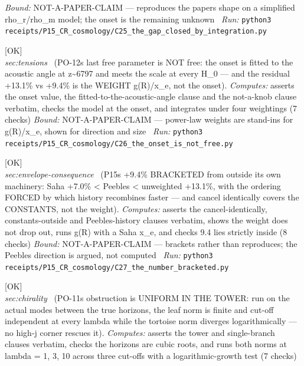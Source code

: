 \begin{description}
 \emph{Bound:} NOT-A-PAPER-CLAIM --- reproduces the papers shape on a simplified rho\_r/rho\_m model; the onset is the remaining unknown
\ \emph{Run:} \texttt{python3 receipts/P15\_CR\_cosmology/C25\_the\_gap\_closed\_by\_integration.py}
\item[\label{rcpt:C26_the_onset_is_not_free}\texttt{C26\_the\_onset\_is\_not\_free}]\hfill\textsf{[OK]}\\
\textit{sec:tensions} \ (PO-12s last free parameter is NOT free: the onset is fitted to the acoustic angle at z\textasciitilde{}6797 and meets the scale at every H\_0 --- and the residual +13.1\% vs +9.4\% is the WEIGHT g(R)/x\_e, not the onset). 
\emph{Computes:} asserts the onset value, the fitted-to-the-acoustic-angle clause and the not-a-knob clause verbatim, checks the model at the onset, and integrates under four weightings (7 checks)
 \emph{Bound:} NOT-A-PAPER-CLAIM --- power-law weights are stand-ins for g(R)/x\_e, shown for direction and size
\ \emph{Run:} \texttt{python3 receipts/P15\_CR\_cosmology/C26\_the\_onset\_is\_not\_free.py}
\item[\label{rcpt:C27_the_number_bracketed}\texttt{C27\_the\_number\_bracketed}]\hfill\textsf{[OK]}\\
\textit{sec:envelope-consequence} \ (P15s +9.4\% BRACKETED from outside its own machinery: Saha +7.0\% < Peebles < unweighted +13.1\%, with the ordering FORCED by which history recombines faster --- and cancel identically covers the CONSTANTS, not the weight). 
\emph{Computes:} asserts the cancel-identically, constants-outside and Peebles-history clauses verbatim, shows the weight does not drop out, runs g(R) with a Saha x\_e, and checks 9.4 lies strictly inside (8 checks)
 \emph{Bound:} NOT-A-PAPER-CLAIM --- brackets rather than reproduces; the Peebles direction is argued, not computed
\ \emph{Run:} \texttt{python3 receipts/P15\_CR\_cosmology/C27\_the\_number\_bracketed.py}
\item[\label{rcpt:B22_the_tower_is_uniform}\texttt{B22\_the\_tower\_is\_uniform}]\hfill\textsf{[OK]}\\
\textit{sec:chirality} \ (PO-11s obstruction is UNIFORM IN THE TOWER: run on the actual modes between the true horizons, the leaf norm is finite and cut-off independent at every lambda while the tortoise norm diverges logarithmically --- no high-j corner rescues it). 
\emph{Computes:} asserts the tower and single-branch clauses verbatim, checks the horizons are cubic roots, and runs both norms at lambda = 1, 3, 10 across three cut-offs with a logarithmic-growth test (7 checks)

\end{description}
